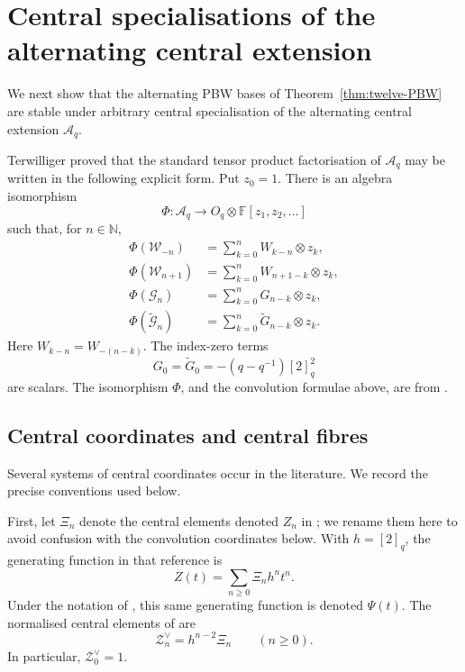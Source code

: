 \documentclass[11pt]{extarticle}
\theoremstyle{definition}
\theoremstyle{remark}
\numberwithin{equation}{section}
\newcommand{\F}{\mathbb F}
\newcommand{\N}{\mathbb N}
\newcommand{\Oq}{O_q}
\newcommand{\Aq}{\mathcal A_q}
\newcommand{\cW}{\mathcal W}
\newcommand{\cG}{\mathcal G}
\newcommand{\ctG}{\widetilde{\mathcal G}}
\newcommand{\XiC}{\Xi}
\newcommand{\Zvee}{\mathcal Z^{\vee}}
\begin{document}
\section{Central specialisations of the alternating central extension}
\label{sec:central-specialisations}

We next show that the alternating PBW bases of
Theorem~\ref{thm:twelve-PBW} are stable under arbitrary central
specialisation of the alternating central extension \(\Aq\).

Terwilliger proved that the standard tensor product factorisation of
\(\Aq\) may be written in the following explicit form.  Put \(z_0=1\).
There is an algebra isomorphism
\[
        \Phi:\Aq\longrightarrow \Oq\otimes\F[z_1,z_2,\ldots]
\]
such that, for \(n\in\N\),
\begin{align}
\Phi(\cW_{-n})
 &=\sum_{k=0}^{n}W_{k-n}\otimes z_k,
\label{eq:central-convolution-Wminus}\\
\Phi(\cW_{n+1})
 &=\sum_{k=0}^{n}W_{n+1-k}\otimes z_k,
\label{eq:central-convolution-Wplus}\\
\Phi(\cG_n)
 &=\sum_{k=0}^{n}G_{n-k}\otimes z_k,
\label{eq:central-convolution-G}\\
\Phi(\ctG_n)
 &=\sum_{k=0}^{n}\widetilde G_{n-k}\otimes z_k.
\label{eq:central-convolution-tG}
\end{align}
Here \(W_{k-n}=W_{-(n-k)}\).  The index-zero terms
\[
        G_0=\widetilde G_0=-(q-q^{-1})[2]_q^2
\]
are scalars.  The isomorphism \(\Phi\), and the convolution formulae above,
are from \cite[Theorem~13.5 and Lemma~13.1]
{Terwilliger2022OqACE}.

\subsection{Central coordinates and central fibres}

Several systems of central coordinates occur in the literature.  We record
the precise conventions used below.

First, let \(\XiC_n\) denote the central elements denoted $Z_n$ in
\cite[Definition~8.6]{Terwilliger2021ACE}; we rename them here to avoid
confusion with the convolution coordinates below.  With \(h=[2]_q\),
the generating function in that reference is
\[
        Z(t)=\sum_{n\geq0}\XiC_nh^nt^n.
\]
Under the notation of \cite[Definition~8.1 and Note~8.2]
{Terwilliger2022OqACE}, this same generating function is denoted
\(\Psi(t)\).
The normalised central elements of
\cite[Definitions~8.3 and~8.4]{Terwilliger2022OqACE} are
\begin{equation}
\label{eq:Xi-Zvee}
        \Zvee_n=h^{n-2}\XiC_n
        \qquad(n\geq0).
\end{equation}
In particular, \(\Zvee_0=1\).
\end{document}
